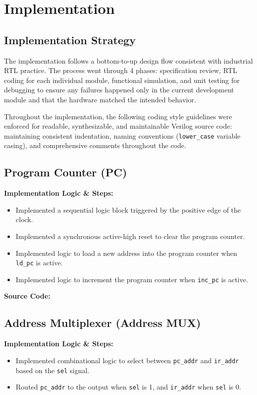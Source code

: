 \section{Implementation}\label{sec:implementation} %
\subsection{Implementation Strategy}
The implementation follows a bottom-to-up design flow consistent with industrial RTL practice. The process went through 4 phases: specification review, RTL coding for each individual module, functional simulation, and unit testing for debugging to ensure any failures happened only in the current development module and that the hardware matched the intended behavior.

Throughout the implementation, the following coding style guidelines were enforced for readable, synthesizable, and maintainable Verilog source code: maintaining consistent indentation, naming conventions (\texttt{lower\_case} variable casing), and comprehensive comments throughout the code.

\subsection{Program Counter (PC)}
\textbf{Implementation Logic \& Steps:}
\begin{itemize}
	\item Implemented a sequential logic block triggered by the positive edge of the clock.
	\item Implemented a synchronous active-high reset to clear the program counter.
	\item Implemented logic to load a new address into the program counter when \texttt{ld\_pc} is active.
	\item Implemented logic to increment the program counter when \texttt{inc\_pc} is active.
\end{itemize}

\textbf{Source Code:}

\subsection{Address Multiplexer (Address MUX)}
\textbf{Implementation Logic \& Steps:}
\begin{itemize}
	\item Implemented combinational logic to select between \texttt{pc\_addr} and \texttt{ir\_addr} based on the \texttt{sel} signal.
	\item Routed \texttt{pc\_addr} to the output when \texttt{sel} is 1, and \texttt{ir\_addr} when \texttt{sel} is 0.
\end{itemize}

